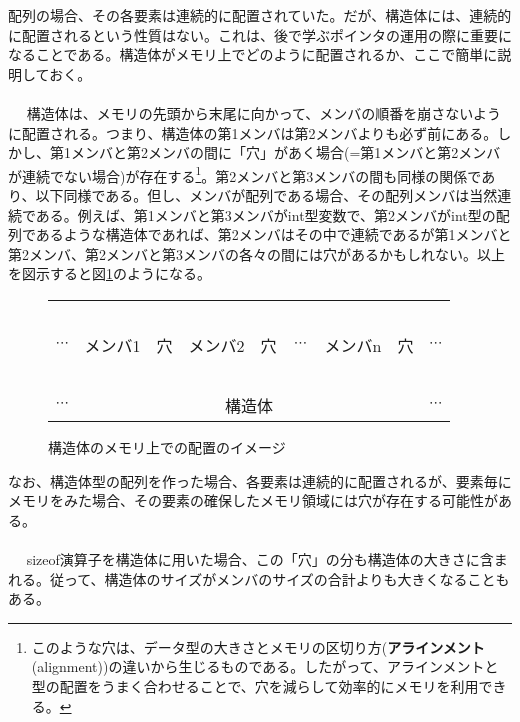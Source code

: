 配列の場合、その各要素は連続的に配置されていた。だが、構造体には、連続的に配置されるという性質はない。これは、後で学ぶポインタの運用の際に重要になることである。構造体がメモリ上でどのように配置されるか、ここで簡単に説明しておく。
\\ \\　
構造体は、メモリの先頭から末尾に向かって、メンバの順番を崩さないように配置される。つまり、構造体の第1メンバは第2メンバよりも必ず前にある。しかし、第1メンバと第2メンバの間に「穴」があく場合(=第1メンバと第2メンバが連続でない場合)が存在する\footnote{このような穴は、データ型の大きさとメモリの区切り方(\textbf{アラインメント}(alignment))の違いから生じるものである。したがって、アラインメントと型の配置をうまく合わせることで、穴を減らして効率的にメモリを利用できる。}。第2メンバと第3メンバの間も同様の関係であり、以下同様である。但し、メンバが配列である場合、その配列メンバは当然連続である。例えば、第1メンバと第3メンバがint型変数で、第2メンバがint型の配列であるような構造体であれば、第2メンバはその中で連続であるが第1メンバと第2メンバ、第2メンバと第3メンバの各々の間には穴があるかもしれない。以上を図示すると図\ref{chap09_fig01}のようになる。
\begin{figure}[htb]
\centering
\begin{tabular}{|c|c|c|c|c|c|c|c|c|}\hline
&　&　&　&　&　&　& &\\
$\cdots$&メンバ1&穴&メンバ2&穴&$\cdots$&メンバn&穴&$\cdots$ \\
&　&　&　&　&　&　& &\\ \hline
$\cdots$&\multicolumn{7}{|c|}{構造体}&$\cdots$\\ \hline
\end{tabular}
\caption{構造体のメモリ上での配置のイメージ}\label{chap09_fig01}
\end{figure}

なお、構造体型の配列を作った場合、各要素は連続的に配置されるが、要素毎にメモリをみた場合、その要素の確保したメモリ領域には穴が存在する可能性がある。
\\ \\　
sizeof演算子を構造体に用いた場合、この「穴」の分も構造体の大きさに含まれる。従って、構造体のサイズがメンバのサイズの合計よりも大きくなることもある。

